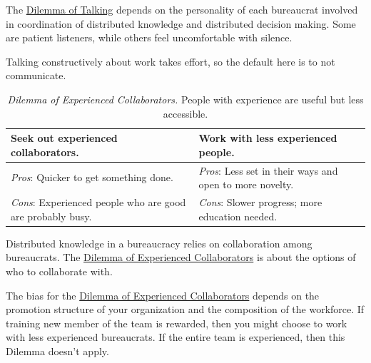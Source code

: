 The \href{table:talk-or-listen}{Dilemma of Talking} depends on the personality of each bureaucrat involved in coordination of distributed knowledge and distributed decision making. Some are patient listeners, while others feel uncomfortable with silence.

Talking constructively about work takes effort, so the default here is to not communicate. 


\begin{center}
\begin{table}[H] %
\begin{tabular}{ | m{\dilemmatablewidth}| m{\dilemmatablewidth} | } 
  \hline
  \textbf{Seek out experienced collaborators.} & 
  \textbf{Work with less experienced people.} \\ 
  \hline
  \textit{Pros}: Quicker to get something done. &
  \textit{Pros}: Less set in their ways and open to more novelty. \\  
  \hline
  \textit{Cons}: Experienced people who are good are probably busy. &
  \textit{Cons}: Slower progress; more education needed. \\  
  \hline
\end{tabular}
\caption{
\textit{Dilemma of Experienced Collaborators.}
People with experience are useful but less accessible.
}
\label{table:experience}
\end{table}
\end{center}


Distributed knowledge in a bureaucracy relies on collaboration among bureaucrats. 
The \href{table:experience}{Dilemma of Experienced Collaborators} is about the options of who to collaborate with. 


The bias for the \href{table:experience}{Dilemma of Experienced Collaborators} depends on the promotion structure of your organization and the composition of the workforce. If training new member of the team is rewarded, then you might choose to work with less experienced bureaucrats. If the entire team is experienced, then this Dilemma doesn't apply.


